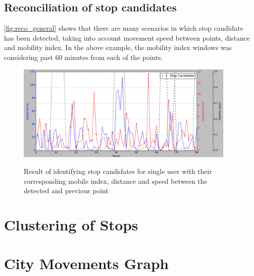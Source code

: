 \subsection{Reconciliation of stop candidates}

\autoref{fig:reco_general} shows that there are many scenarios in which stop candidate has been detected, taking into account movement speed between points, distance and mobility index. In the above example, the mobility index windows was considering past 60 minutes from each of the points. 

\begin{figure}[!ht]
	\centering
	\includegraphics[width=0.95\textwidth]{images/reco_general.png}\\
	\caption{Result of identifying stop candidates for single user with their corresponding mobile index, distance and speed between the detected and previous point }
	\label{fig:reco_general}
\end{figure}

\FloatBarrier

\section{Clustering of Stops}

\FloatBarrier
\section{City Movements Graph}

\FloatBarrier